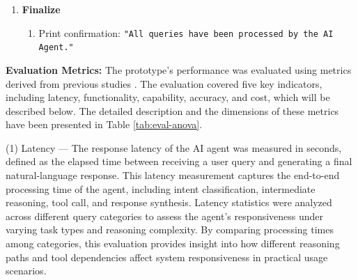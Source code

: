 \documentclass[final,3p,times]{elsarticle}
\begin{document}
\begin{algorithm}[t]
\begin{enumerate}
\begin{enumerate}
\begin{enumerate}
                (d) If agent\_state = \texttt{"requires\_action"}: \\
                \Indp
                    perform function calls, gather function\_result, \\
                    and submit function\_result back to the AI agent. \\
                \Indm
                (e) Continue running the AI agent until agent\_state = \texttt{"end"}. \\
                (f) Stop the timer and record execution time and token usage. \\
                (g) Record function calls, execution time, token usage, and response content in query\_id\_interaction\_log\_file (md). \\
                (h) If necessary, update memory\_file and save as updated\_memory\_file \\
            \Indm
        \end{enumerate}
    \end{enumerate}

  \item \textbf{Finalize}
    \begin{enumerate}
      \item Print confirmation: \texttt{"All queries have been processed by the AI Agent."}
    \end{enumerate}
\end{enumerate}

\end{algorithm}

\textbf{Evaluation Metrics:}
The prototype’s performance was evaluated using metrics derived from previous studies \cite{chang2024survey, zhang2024generative, jin2023human}. The evaluation covered five key indicators, including latency, functionality, capability, accuracy, and cost, which will be described below. The detailed description and the dimensions of these metrics have been presented in Table \ref{tab:eval-anova}.

(1) Latency --- The response latency of the AI agent was measured in seconds, defined as the elapsed time between receiving a user query and generating a final natural-language response. This latency measurement captures the end-to-end processing time of the agent, including intent classification, intermediate reasoning, tool call, and response synthesis. Latency statistics were analyzed across different query categories to assess the agent’s responsiveness under varying task types and reasoning complexity. By comparing processing times among categories, this evaluation provides insight into how different reasoning paths and tool dependencies affect system responsiveness in practical usage scenarios.
\end{document}

